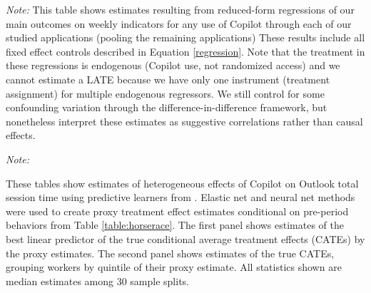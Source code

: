 \documentclass{article}
\newenvironment{tablenotes}{
    \begin{flushleft} \small
    \textit{Note:} 
}{
    \end{flushleft}
}
\begin{document}
\begin{table}[htbp]
    \caption{Reduced Form Regressions of Outcomes on Application-Specific Copilot Usage}
     \label{tab:indiv_copilot_redform}
    \begin{tablenotes} This table shows estimates resulting from reduced-form regressions of our main outcomes on weekly indicators for any use of Copilot through each of our studied applications (pooling the remaining applications) These results include all fixed effect controls described in Equation \ref{regression}. Note that the treatment in these regressions is endogenous (Copilot use, not randomized access) and we cannot estimate a LATE because we have only one instrument (treatment assignment) for multiple endogenous regressors. We still control for some confounding variation through the difference-in-difference framework, but nonetheless interpret these estimates as suggestive correlations rather than causal effects.
    \end{tablenotes}
\end{table}


\begin{table}[htbp]
    \caption{Treatment Effect Heterogeneity by Pre-Period Behavior}
    \label{table:heterogeneity}
    
    \vspace{0.5em}
    
    \begin{tablenotes} 
    These tables show estimates of heterogeneous effects of Copilot on Outlook total session time using predictive learners from \citet{chernozhukov2025heteffects}. Elastic net and neural net methods were used to create proxy treatment effect estimates conditional on pre-period behaviors from Table \ref{table:horserace}. The first panel shows estimates of the best linear predictor of the true conditional average treatment effects (CATEs) by the proxy estimates. The second panel shows estimates of the true CATEs, grouping workers by quintile of their proxy estimate. All statistics shown are median estimates among 30 sample splits.
    \end{tablenotes}
\end{table}
\end{document}
